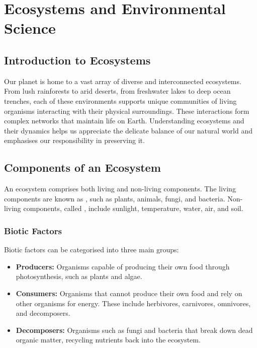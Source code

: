 \chapter{Ecosystems and Environmental Science}

\section{Introduction to Ecosystems}

Our planet is home to a vast array of diverse and interconnected ecosystems. From lush rainforests to arid deserts, from freshwater lakes to deep ocean trenches, each of these environments supports unique communities of living organisms interacting with their physical surroundings. These interactions form complex networks that maintain life on Earth. Understanding ecosystems and their dynamics helps us appreciate the delicate balance of our natural world and emphasises our responsibility in preserving it.


\section{Components of an Ecosystem}

An ecosystem comprises both living and non-living components. The living components are known as , such as plants, animals, fungi, and bacteria. Non-living components, called , include sunlight, temperature, water, air, and soil.

\subsection{Biotic Factors}

Biotic factors can be categorised into three main groups:

\begin{itemize}
    \item \textbf{Producers:} Organisms capable of producing their own food through photosynthesis, such as plants and algae.
    \item \textbf{Consumers:} Organisms that cannot produce their own food and rely on other organisms for energy. These include herbivores, carnivores, omnivores, and decomposers.
    \item \textbf{Decomposers:} Organisms such as fungi and bacteria that break down dead organic matter, recycling nutrients back into the ecosystem.
\end{itemize}


